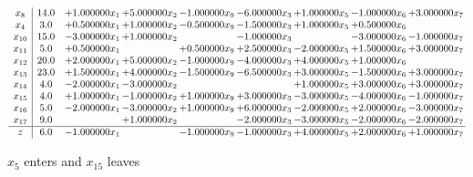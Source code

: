 \documentclass[10pt]{article}
\begin{document}
 \[\begin{array}{c| c c@{\hskip 2pt} c@{\hskip 2pt} c@{\hskip 2pt} c@{\hskip 2pt} c@{\hskip 2pt} c@{\hskip 2pt} c@{\hskip 2pt} }
 x_{8}   &  14.0 & + 1.000000 x_{1} & + 5.000000 x_{2} & -1.000000 x_{9} & -6.000000 x_{3} & + 1.000000 x_{5} & -1.000000 x_{6} & + 3.000000 x_{7}\\
 x_{4}   &  3.0 & + 0.500000 x_{1} & + 1.000000 x_{2} & -0.500000 x_{9} & -1.500000 x_{3} & + 1.000000 x_{5} & + 0.500000 x_{6} &   \\
 x_{10}   &  15.0 & -3.000000 x_{1} & + 1.000000 x_{2} &   & -1.000000 x_{3} &   & -3.000000 x_{6} & -1.000000 x_{7}\\
 x_{11}   &  5.0 & + 0.500000 x_{1} &   & + 0.500000 x_{9} & + 2.500000 x_{3} & -2.000000 x_{5} & + 1.500000 x_{6} & + 3.000000 x_{7}\\
 x_{12}   &  20.0 & + 2.000000 x_{1} & + 5.000000 x_{2} & -1.000000 x_{9} & -4.000000 x_{3} & + 4.000000 x_{5} & + 1.000000 x_{6} &   \\
 x_{13}   &  23.0 & + 1.500000 x_{1} & + 4.000000 x_{2} & -1.500000 x_{9} & -6.500000 x_{3} & + 3.000000 x_{5} & -1.500000 x_{6} & + 3.000000 x_{7}\\
 x_{14}   &  4.0 & -2.000000 x_{1} & -3.000000 x_{2} &    &   & + 1.000000 x_{5} & + 3.000000 x_{6} & + 3.000000 x_{7}\\
 x_{15}   &  4.0 & + 1.000000 x_{1} & -1.000000 x_{2} & + 1.000000 x_{9} & + 3.000000 x_{3} & -3.000000 x_{5} & -4.000000 x_{6} & -1.000000 x_{7}\\
 x_{16}   &  5.0 & -2.000000 x_{1} & -3.000000 x_{2} & + 1.000000 x_{9} & + 6.000000 x_{3} & -2.000000 x_{5} & + 2.000000 x_{6} & -3.000000 x_{7}\\
 x_{17}   &  9.0  &   & + 1.000000 x_{2} &   & -2.000000 x_{3} & -3.000000 x_{5} & -2.000000 x_{6} & -2.000000 x_{7}\\
\hline
z    &  6.0 & -1.000000 x_{1} &   & -1.000000 x_{9} & -1.000000 x_{3} & + 4.000000 x_{5} & + 2.000000 x_{6} & + 1.000000 x_{7}\\
\end{array}\]


 $ x_{5} $ enters and $ x_{15} $ leaves 
\end{document}
